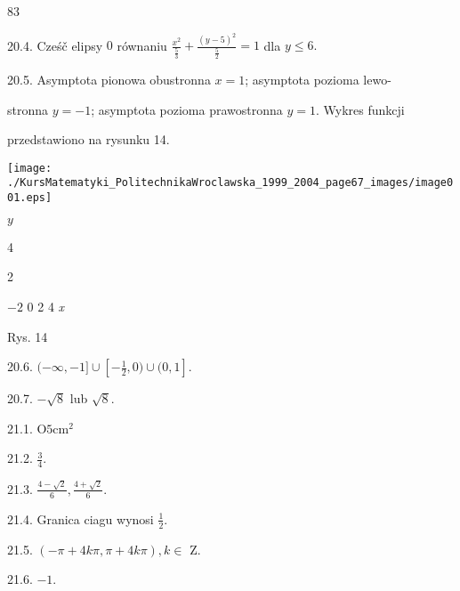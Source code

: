 \documentclass[a4paper,12pt]{article}
\begin{document}
83

20.4. Cześč elipsy $0$ równaniu $\displaystyle \frac{x^{2}}{\frac{5}{3}}+\frac{(y-5)^{2}}{\frac{5}{2}}=1$ dla $y\leq 6.$

20.5. Asymptota pionowa obustronna $x=1$; asymptota pozioma lewo-

stronna $y=-1$; asymptota pozioma prawostronna $y=1$. Wykres funkcji

przedstawiono na rysunku 14.
\begin{center}
\texttt{[image: ./KursMatematyki\_PolitechnikaWroclawska\_1999\_2004\_page67\_images/image001.eps]}
\end{center}
$y$

4

2

$-2$  0 2  4  {\it x}

Rys. 14

20.6. $(-\displaystyle \infty,-1]\cup[-\frac{1}{2},0)\cup(0,1].$

20.7. $-\sqrt{8}$ lub $\sqrt{8}.$

21.1. $\mathrm{O} 5\mathrm{c}\mathrm{m}^{2}$

21.2. $\displaystyle \frac{3}{4}.$

21.3. $\displaystyle \frac{4-\sqrt{2}}{6}, \displaystyle \frac{4+\sqrt{2}}{6}.$

21.4. Granica ciagu wynosi $\displaystyle \frac{1}{2}.$

21.5. $(-\pi+4k\pi,\pi+4k\pi),  k\in$ Z.

21.6. $-1.$
\end{document}
